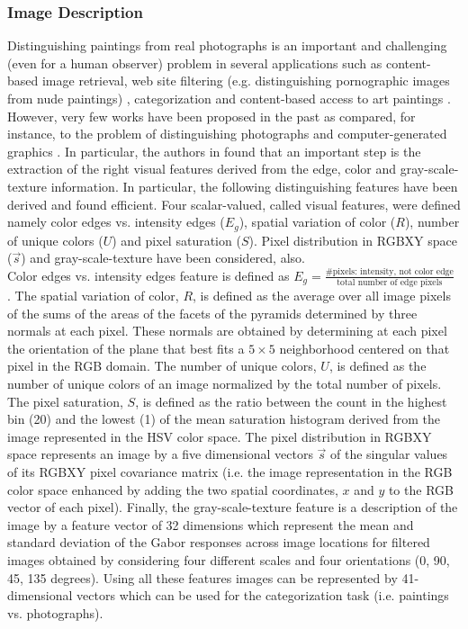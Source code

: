 \documentclass[journal,10pt]{elsart}
\begin{document}
\subsubsection{Image Description}
Distinguishing paintings from real photographs is an important and challenging (even for a human observer) problem in several applications such as content-based image retrieval, web site filtering (e.g. distinguishing pornographic images from nude paintings) \cite{Cutzu2003,Cutzu2005}, categorization \cite{DBLP:journals/cg/WallravenFCRFS09} and content-based access to art paintings \cite{1530116}. However, very few works have been proposed in the past \cite{Cutzu2003,Cutzu2005,1530116,1334289} as compared, for instance, to the problem of distinguishing photographs and computer-generated graphics \cite{629715,Farid2005,4284852}. In particular, the authors in \cite{Cutzu2003,Cutzu2005} found that an important step is the extraction of the right visual features derived from the edge, color and gray-scale-texture information. In particular, the following distinguishing features have been derived and found efficient. Four scalar-valued, called visual features, were defined namely color edges vs. intensity edges ($E_g$), spatial variation of color ($R$), number of unique colors ($U$) and pixel saturation ($S$). Pixel distribution in RGBXY space ($\vec{s}$) and gray-scale-texture have been considered, also. \\
Color edges vs. intensity edges feature is defined as $E_g=\frac{\# \text{pixels: intensity, not color edge}}{\text{total number of edge pixels}}$ \cite{Cutzu2003,Cutzu2005}. The spatial variation of color, $R$, is defined as the average over all image pixels of the sums of the areas of the facets of the pyramids determined by three normals at each pixel. These normals are obtained by determining at each pixel the orientation of the plane that best fits a $5 \times 5$ neighborhood centered on that pixel in the RGB domain. The number of unique colors, $U$, is defined as the number of unique colors of an image normalized by the total number of pixels. The pixel saturation, $S$, is defined as the ratio between the count in the highest bin (20) and the lowest (1) of the mean saturation histogram derived from the image represented in the HSV color space. The pixel distribution in RGBXY space represents an image by a five dimensional vectors $\vec{s}$ of the singular values of its RGBXY pixel covariance matrix (i.e. the image representation in the RGB color space enhanced by adding the two spatial coordinates, $x$ and $y$ to the RGB vector of each pixel). Finally, the gray-scale-texture feature is a description of the image by a feature vector of 32 dimensions which represent the mean and standard deviation of the Gabor responses across image locations for filtered images obtained by considering four different scales and four orientations (0, 90, 45, 135 degrees). Using all these features images can be represented by 41-dimensional vectors which can be used for the categorization task (i.e. paintings vs. photographs).
\end{document}

